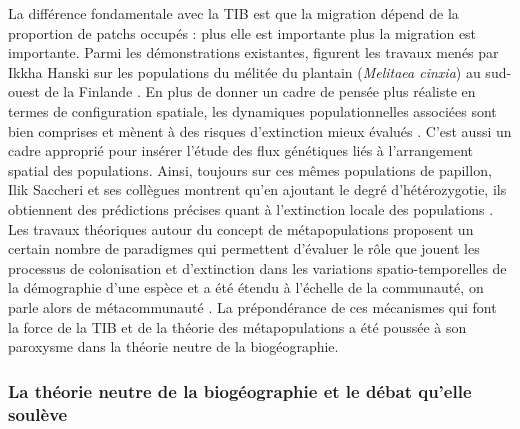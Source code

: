 La différence fondamentale avec la TIB est que la migration dépend de la
proportion de patchs occupés : plus elle est importante plus la
migration est importante. Parmi les démonstrations existantes, figurent
les travaux menés par Ikkha Hanski sur les populations du mélitée du
plantain (\emph{Melitaea cinxia}) au sud-ouest de la Finlande
\citep{Hanski1998}. En plus de donner un cadre de pensée plus réaliste
en termes de configuration spatiale, les dynamiques populationnelles
associées sont bien comprises et mènent à des risques d'extinction mieux
évalués \citep{Hanski1998}. C'est aussi un cadre approprié pour insérer
l'étude des flux génétiques liés à l'arrangement spatial des
populations. Ainsi, toujours sur ces mêmes populations de papillon, Ilik
Saccheri et ses collègues montrent qu'en ajoutant le degré
d'hétérozygotie, ils obtiennent des prédictions précises quant à
l'extinction locale des populations \citep{Saccheri1998}. Les travaux
théoriques autour du concept de métapopulations proposent un certain
nombre de paradigmes qui permettent d'évaluer le rôle que jouent les
processus de colonisation et d'extinction dans les variations
spatio-temporelles de la démographie d'une espèce et a été étendu à
l'échelle de la communauté, on parle alors de métacommunauté
\citep{Leibold2004, Holyoak2005}. La prépondérance de ces mécanismes qui
font la force de la TIB et de la théorie des métapopulations a été
poussée à son paroxysme dans la théorie neutre de la biogéographie.

\subsubsection*{La théorie neutre de la biogéographie et le débat
qu'elle
soulève}\label{la-thuxe9orie-neutre-de-la-bioguxe9ographie-et-le-duxe9bat-quelle-souluxe8ve}

